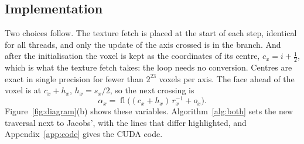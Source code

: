 \documentclass[11pt,a4paper]{article}
\theoremstyle{remark}
\newcommand{\fl}{\operatorname{fl}}
\begin{document}
\subsection{Implementation}

Two choices follow. The texture fetch is placed at the start of each step, identical for all threads,
and only the update of the axis crossed is in the branch. And after the initialisation the voxel is kept
as the coordinates of its centre, $c_x=i+\tfrac12$, which is what the texture fetch takes: the loop needs
no conversion. Centres are exact in single precision for fewer than $2^{23}$ voxels per axis. The face
ahead of the voxel is at $c_x+h_x$, $h_x=s_x/2$, so the next crossing is
\begin{equation}
\alpha_x=\fl\big((c_x+h_x)\,r_x^{-1}+o_x\big). \label{eq:fma}
\end{equation}
Figure~\ref{fig:diagram}(b) shows these variables. Algorithm~\ref{alg:both} sets the new traversal next to
Jacobs', with the lines that differ highlighted, and Appendix~\ref{app:code} gives the CUDA code.
\end{document}
